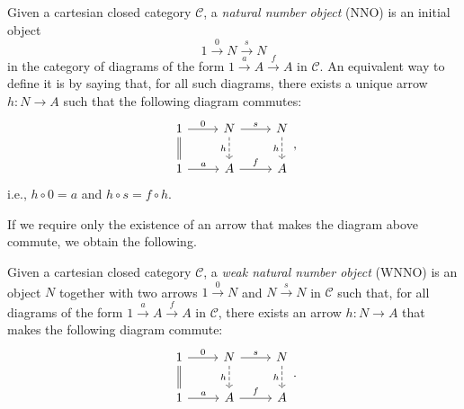 \begin{definition}
    Given a cartesian closed category $\mathcal{C}$, a \emph{natural number object} (NNO) is an initial object
    \[ 1 \xrightarrow{0} N \xrightarrow{s} N \]
    in the category of diagrams of the form $1 \xrightarrow{a} A \xrightarrow{f} A$ in $\mathcal{C}$. An equivalent way to define it is
    by saying that, for all such diagrams, there exists a unique arrow $h : N \to A$ such that the following diagram commutes:
    \[\begin{tikzcd}
        1 & N & N \\
        1 & A & A
        \arrow["0", from=1-1, to=1-2]
        \arrow[shift left=0.20ex, -{}, from=1-1, to=2-1]
        \arrow[shift right=0.20ex, -{}, from=1-1, to=2-1]
        \arrow["s", from=1-2, to=1-3]
        \arrow["h"', dashed, from=1-2, to=2-2]
        \arrow["h"', dashed, from=1-3, to=2-3]
        \arrow["a", from=2-1, to=2-2]
        \arrow["f", from=2-2, to=2-3]
    \end{tikzcd},\]
    i.e., $h \circ 0 = a$ and $h \circ s = f \circ h$.
\end{definition}

If we require only the existence of an arrow that makes the diagram above commute, we obtain the following.

\begin{definition}\label{idx:wnno}
    Given a cartesian closed category $\mathcal{C}$, a \emph{weak natural number object} (WNNO) is an object $N$ together with two arrows $1 \xrightarrow{0} N$ and $N \xrightarrow{s} N$ in $\mathcal C$ such that,
    for all diagrams of the form $1 \xrightarrow{a} A \xrightarrow{f} A$ in $\mathcal{C}$, there exists an arrow $h : N \to A$ that makes the following diagram commute:
    \[\begin{tikzcd}
        1 & N & N \\
        1 & A & A
        \arrow["0", from=1-1, to=1-2]
        \arrow[shift left=0.20ex, -{}, from=1-1, to=2-1]
        \arrow[shift right=0.20ex, -{}, from=1-1, to=2-1]
        \arrow["s", from=1-2, to=1-3]
        \arrow["h"', dashed, from=1-2, to=2-2]
        \arrow["h"', dashed, from=1-3, to=2-3]
        \arrow["a", from=2-1, to=2-2]
        \arrow["f", from=2-2, to=2-3]
    \end{tikzcd}.\]
\end{definition}

